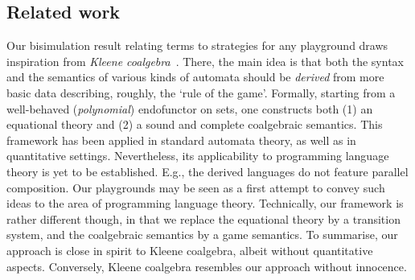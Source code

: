 \documentclass{LMCS}
\theoremstyle{plain}\newtheorem{satz}[thm]{Satz}
\begin{document}
\subsection{Related work}
Our bisimulation result relating terms to strategies for any
playground draws inspiration from \emph{Kleene
  coalgebra}~\cite{DBLP:conf/fossacs/BonsangueRS09,DBLP:conf/concur/BonchiBRS09}. There,
the main idea is that both the syntax and the semantics of various
kinds of automata should be \emph{derived} from more basic data
describing, roughly, the `rule of the game'. Formally, starting from a
well-behaved (\emph{polynomial}) endofunctor on sets, one constructs
both (1) an equational theory and (2) a sound and complete coalgebraic
semantics. This framework has been applied in standard automata
theory, as well as in quantitative settings.  Nevertheless, its
applicability to programming language theory is yet to be
established. E.g., the derived languages do not feature parallel
composition.  Our playgrounds may be seen as a first attempt to convey
such ideas to the area of programming language theory.  Technically,
our framework is rather different though, in that we replace the
equational theory by a transition system, and the coalgebraic
semantics by a game semantics.  To summarise, our approach is close in
spirit to Kleene coalgebra, albeit without quantitative
aspects. Conversely, Kleene coalgebra resembles our approach without
innocence.
\end{document}
